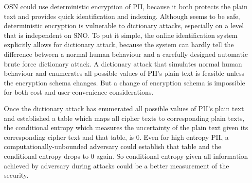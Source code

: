\documentclass[10pt, conference, compsocconf]{IEEEtran}
\begin{document}

    OSN could use deterministic encryption of PII,
    because it both protects the plain text and provides quick identification
    and indexing.
    Although seems to be safe, deterministic encryption is
    vulnerable to dictionary attacks, especially
    on a level that is independent on SNO.
    To put it simple, the online identification system explicitly
    allows for dictionary attack, because the system can hardly tell
    the difference between a normal human behaviour and a carefully
    designed automatic brute force dictionary attack. A dictionary
    attack that simulates normal human behaviour and enumerates all
    possible values of PII's plain text is feasible unless the encryption
    schema changes. But a change of encryption schema is impossible
    for both cost and user-convenience considerations.

    Once the dictionary attack has enumerated all possible values
    of PII's plain text and established a table which maps all cipher texts
    to corresponding plain texts, the conditional entropy \cite{math_book, info_measure}
    which measures the uncertainty of the plain text given
    its corresponding cipher text and that table, is $0$.
    Even for high entropy PII, a
    computationally-unbounded adversary could establish that table
    and the conditional entropy drops to $0$ again.
    So conditional entropy given
    all information achieved by adversary during attacks
    could be a better measurement of the security.
\end{document}
